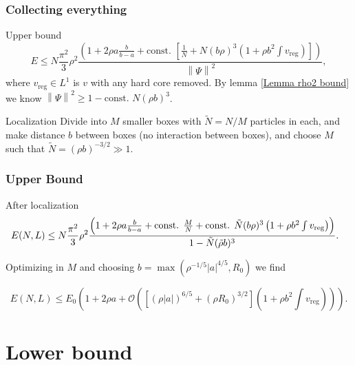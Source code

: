 \documentclass{beamer}[10]
\newcommand{\norm}[1]{\left\lVert #1 \right\rVert}
\newcommand{\abs}[1]{\left\lvert #1 \right\rvert}
\begin{document}
\begin{frame}
	\frametitle{Collecting everything}
	\begin{block}{Upper bound}
	\begin{equation}
	E\leq N\frac{\pi^2}{3}\rho^2\frac{\left(1+2\rho a\frac{b}{b-a} +\text{const. } \left[\frac{1}{N}+ N (b\rho)^3\left(1+\rho b^2\int v_{\text{reg}}\right)\right]\right)}{\norm{\Psi}^2},
	\end{equation}	
	where $ v_{\text{reg}}\in L^{1} $ is $ v $ with any hard core removed.
		By lemma \ref{Lemma rho2 bound} we know $ \norm{\Psi}^2\geq 1-\text{const. }N(\rho b)^3 $.
	\end{block}	
	\begin{block}{Localization}
		Divide into $ M $ smaller boxes with $ \tilde{N}=N/M $ particles in each, and make distance $ b $ between boxes (no interaction between boxes), and choose $ M $ such that $ \tilde{N}=(\rho b)^{-3/2}\gg 1 $.
	\end{block}

\end{frame}

\begin{frame}
	\frametitle{Upper Bound}
	\begin{block}{After localization}
\small\begin{equation}
\hspace{-0.3cm}E(N,L)\leq N\frac{\pi^2}{3}\rho^2\frac{\left(1+2\rho a\frac{b}{b-a}+\text{const. }\frac{M}{N}+\text{const. }\tilde{N}(b\rho)^3\left(1+\rho b^2\int v_{\text{reg}}\right)\right)}{1-\tilde{N}(\tilde{\rho} b)^3}.
\end{equation}

Optimizing in $ M $ and choosing $ b=\max(\rho^{-1/5}\abs{a}^{4/5}, R_0) $ we find

\begin{equation}
E(N,L)\leq E_0\left(1+2\rho a+ \mathcal{O}\left(\left[(\rho \abs{a})^{6/5}+(\rho R_0)^{3/2}\right]\left(1+\rho b^2\int v_{\text{reg}}\right)\right)\right).
\end{equation}

	\end{block}
	
\end{frame}



\section{Lower bound}
\end{document}
